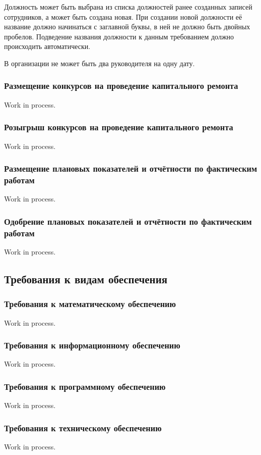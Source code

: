 Должность может быть выбрана из списка должностей ранее созданных записей сотрудников, а может быть создана новая.
При создании новой должности её название должно начинаться с заглавной буквы, в ней не должно быть двойных пробелов.
Подведение названия должности к данным требованием должно происходить автоматически.

В организации не может быть два руководителя на одну дату.

\subsubsection{Размещение конкурсов на проведение капитального ремонта}

Work in process.

\subsubsection{Розыгрыш конкурсов на проведение капитального ремонта}

Work in process.

\subsubsection{Размещение плановых показателей и отчётности по фактическим работам}

Work in process.

\subsubsection{Одобрение плановых показателей и отчётности по фактическим работам}

Work in process.

\subsection{Требования к видам обеспечения}

\subsubsection{Требования к математическому обеспечению}

Work in process.

\subsubsection{Требования к информационному обеспечению}

Work in process.

\subsubsection{Требования к программному обеспечению}

Work in process.

\subsubsection{Требования к техническому обеспечению}

Work in process.

\clearpage
\newpage